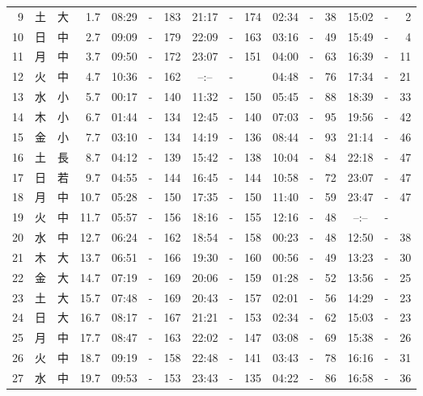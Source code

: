 \documentclass[12pt.a4j]{jsarticle}
\begin{document}
\begin{center}
\begin{table}[ht]
\begin{tabular}{|rc|cr|ccrccr|ccrccr|}
 9 & 土 & 大 &  1.7 &  08:29 &-& 183  &  21:17 &-& 174  &   02:34 &-&  38  &   15:02 &-&   2  \\
10 & 日 & 中 &  2.7 &  09:09 &-& 179  &  22:09 &-& 163  &   03:16 &-&  49  &   15:49 &-&   4  \\
11 & 月 & 中 &  3.7 &  09:50 &-& 172  &  23:07 &-& 151  &   04:00 &-&  63  &   16:39 &-&  11  \\
12 & 火 & 中 &  4.7 &  10:36 &-& 162  &  --:-- &-&     &   04:48 &-&  76  &   17:34 &-&  21  \\
13 & 水 & 小 &  5.7 &  00:17 &-& 140  &  11:32 &-& 150  &   05:45 &-&  88  &   18:39 &-&  33  \\
14 & 木 & 小 &  6.7 &  01:44 &-& 134  &  12:45 &-& 140  &   07:03 &-&  95  &   19:56 &-&  42  \\
15 & 金 & 小 &  7.7 &  03:10 &-& 134  &  14:19 &-& 136  &   08:44 &-&  93  &   21:14 &-&  46  \\
16 & 土 & 長 &  8.7 &  04:12 &-& 139  &  15:42 &-& 138  &   10:04 &-&  84  &   22:18 &-&  47  \\
17 & 日 & 若 &  9.7 &  04:55 &-& 144  &  16:45 &-& 144  &   10:58 &-&  72  &   23:07 &-&  47  \\
18 & 月 & 中 & 10.7 &  05:28 &-& 150  &  17:35 &-& 150  &   11:40 &-&  59  &   23:47 &-&  47  \\
19 & 火 & 中 & 11.7 &  05:57 &-& 156  &  18:16 &-& 155  &   12:16 &-&  48  &   --:-- &-&     \\
20 & 水 & 中 & 12.7 &  06:24 &-& 162  &  18:54 &-& 158  &   00:23 &-&  48  &   12:50 &-&  38  \\
21 & 木 & 大 & 13.7 &  06:51 &-& 166  &  19:30 &-& 160  &   00:56 &-&  49  &   13:23 &-&  30  \\
22 & 金 & 大 & 14.7 &  07:19 &-& 169  &  20:06 &-& 159  &   01:28 &-&  52  &   13:56 &-&  25  \\
23 & 土 & 大 & 15.7 &  07:48 &-& 169  &  20:43 &-& 157  &   02:01 &-&  56  &   14:29 &-&  23  \\
24 & 日 & 大 & 16.7 &  08:17 &-& 167  &  21:21 &-& 153  &   02:34 &-&  62  &   15:03 &-&  23  \\
25 & 月 & 中 & 17.7 &  08:47 &-& 163  &  22:02 &-& 147  &   03:08 &-&  69  &   15:38 &-&  26  \\
26 & 火 & 中 & 18.7 &  09:19 &-& 158  &  22:48 &-& 141  &   03:43 &-&  78  &   16:16 &-&  31  \\
27 & 水 & 中 & 19.7 &  09:53 &-& 153  &  23:43 &-& 135  &   04:22 &-&  86  &   16:58 &-&  36  \\

\end{tabular}
\end{table}
\end{center}
\end{document}
